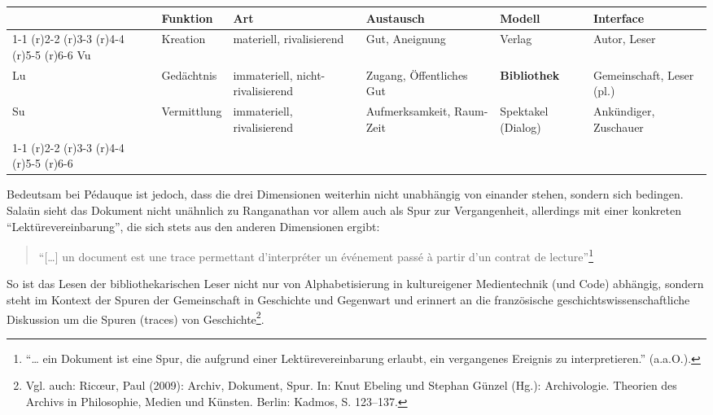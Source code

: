 \begin{sidewaystable}
\small
\begin{tabular}{p{0.2cm}p{1.5cm}p{2cm}p{3cm}p{1.5cm}p{2cm}}
 \toprule
 & Funktion & Art & Austausch & Modell & Interface \\
 \cmidrule(r){1-1} \cmidrule(r){2-2} \cmidrule(r){3-3} \cmidrule(r){4-4} \cmidrule(r){5-5} \cmidrule(r){6-6}
 Vu & Kreation & materiell, rivalisierend & Gut, Aneignung & Verlag &
 Autor, Leser\\
 Lu & Gedächtnis & immateriell, nicht-rivali\-sierend & Zugang,
 Öffentliches Gut & \textbf{Bibliothek} & Gemeinschaft, Leser
 (pl.)\\
 Su & Vermittlung & immateriell, rivalisierend & Aufmerksamkeit,
 Raum-Zeit & Spektakel (Dialog) & Ankündiger, Zuschauer\\
 \cmidrule(r){1-1} \cmidrule(r){2-2} \cmidrule(r){3-3} \cmidrule(r){4-4} \cmidrule(r){5-5} \cmidrule(r){6-6}
 \bottomrule
 \end{tabular}
 \caption*{Vu - Lu - Su (nach J.M. Salaün 2012, chap. 4; meine Übertragung)}
 \end{sidewaystable}
 
Bedeutsam bei Pédauque ist jedoch, dass die drei Dimensionen weiterhin
nicht unabhängig von einander stehen, sondern sich bedingen. Salaün
sieht das Dokument nicht unähnlich zu Ranganathan vor allem auch als
Spur zur Vergangenheit, allerdings mit einer konkreten
\enquote{Lektürevereinbarung}, die sich stets aus den anderen
Dimensionen ergibt:

\begin{flushleft}
\begin{quote}
\enquote{{[}\ldots{}{]} un document est une trace permettant
d'interpréter un événement passé à partir d'un contrat de
lecture}\footnote{\enquote{\ldots{} ein Dokument ist eine Spur, die
  aufgrund einer Lektürevereinbarung erlaubt, ein vergangenes Ereignis
  zu interpretieren.} (a.a.O.).}
\end{quote}
\end{flushleft}


So ist das Lesen der bibliothekarischen Leser nicht nur von
Alphabetisierung in kultureigener Medientechnik (und Code) abhängig,
sondern steht im Kontext der Spuren der Gemeinschaft in Geschichte und
Gegenwart und erinnert an die französische geschichtswissenschaftliche
Diskussion um die Spuren (traces) von Geschichte\footnote{Vgl. auch:
  Ricœur, Paul (2009): Archiv, Dokument, Spur. In: Knut Ebeling und
  Stephan Günzel (Hg.): Archivologie. Theorien des Archivs in
  Philosophie, Medien und Künsten. Berlin: Kadmos, S. 123--137.}.

